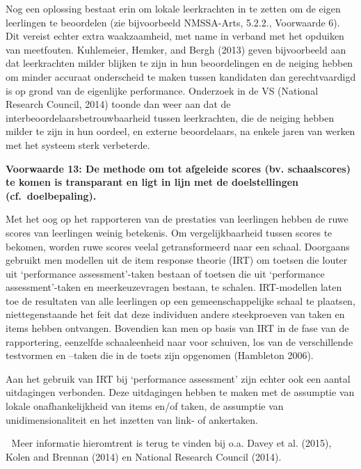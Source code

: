 \documentclass[
  letterpaper,
]{report}
\begin{document}
Nog een oplossing bestaat erin om lokale leerkrachten in te zetten om de
eigen leerlingen te beoordelen (zie bijvoorbeeld NMSSA-Arts, 5.2.2.,
Voorwaarde 6). Dit vereist echter extra waakzaamheid, met name in
verband met het opduiken van meetfouten. Kuhlemeier, Hemker, and Bergh
(2013) geven bijvoorbeeld aan dat leerkrachten milder blijken te zijn in
hun beoordelingen en de neiging hebben om minder accuraat onderscheid te
maken tussen kandidaten dan gerechtvaardigd is op grond van de
eigenlijke performance. Onderzoek in de VS (National Research Council,
2014) toonde dan weer aan dat de interbeoordelaarsbetrouwbaarheid tussen
leerkrachten, die de neiging hebben milder te zijn in hun oordeel, en
externe beoordelaars, na enkele jaren van werken met het systeem sterk
verbeterde.

\textbf{Voorwaarde 13: De methode om tot afgeleide scores (bv.
schaalscores) te komen is transparant en ligt in lijn met de
doelstellingen (cf.~doelbepaling).}

Met het oog op het rapporteren van de prestaties van leerlingen hebben
de ruwe scores van leerlingen weinig betekenis. Om vergelijkbaarheid
tussen scores te bekomen, worden ruwe scores veelal getransformeerd naar
een schaal. Doorgaans gebruikt men modellen uit de item response theorie
(IRT) om toetsen die louter uit `performance assessment'-taken bestaan
of toetsen die uit `performance assessment'-taken en meerkeuzevragen
bestaan, te schalen. IRT-modellen laten toe de resultaten van alle
leerlingen op een gemeenschappelijke schaal te plaatsen,
niettegenstaande het feit dat deze individuen andere steekproeven van
taken en items hebben ontvangen. Bovendien kan men op basis van IRT in
de fase van de rapportering, eenzelfde schaaleenheid naar voor schuiven,
los van de verschillende testvormen en --taken die in de toets zijn
opgenomen (Hambleton 2006).

Aan het gebruik van IRT bij `performance assessment' zijn echter ook een
aantal uitdagingen verbonden. Deze uitdagingen hebben te maken met de
assumptie van lokale onafhankelijkheid van items en/of taken, de
assumptie van unidimensionaliteit en het inzetten van link- of
ankertaken.

📖 Meer informatie hieromtrent is terug te vinden bij o.a. Davey et al.
(2015), Kolen and Brennan (2014) en National Research Council (2014).
\end{document}
